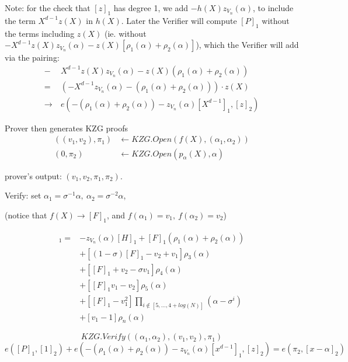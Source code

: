 \documentclass{article}
\theoremstyle{definition}
\begin{document}
\begin{footnotesize}
	Note: for the check that $[z]_1$ has degree 1, we add $-h(X) z_{V_n}(\alpha)$, to include the term $X^{d-1} z(X)$ in $h(X)$. Later the Verifier will compute $[P]_1$ without the terms including $z(X)$ (ie. without $-X^{d-1} z(X)z_{V_n}(\alpha)-z(X)[\rho_1(\alpha)+\rho_2(\alpha)]$), which the Verifier will add via the pairing:
	\begin{align*}
		-&X^{d-1} z(X)z_{V_n}(\alpha)-z(X)(\rho_1(\alpha)+\rho_2(\alpha))\\
		=~ &(-X^{d-1} z_{V_n}(\alpha) - (\rho_1(\alpha)+\rho_2(\alpha))) \cdot z(X)\\
		\longrightarrow~ &e(- (\rho_1(\alpha)+\rho_2(\alpha)) - z_{V_n}(\alpha) [X^{d-1}]_1, [z]_2)
	\end{align*}
\end{footnotesize}


Prover then generates KZG proofs
\begin{align*}
	((v_1, v_2), \pi_1) &\leftarrow KZG.Open(f(X), (\alpha_1, \alpha_2))\\
	(0, \pi_2) &\leftarrow KZG.Open(p_{\alpha}(X), \alpha)
\end{align*}

prover's output: $(v_1, v_2, \pi_1, \pi_2)$.

Verify:
set $\alpha_1=\sigma^{-1}\alpha, ~\alpha_2=\sigma^{-2}\alpha$,

\begin{footnotesize}(notice that $f(X)\rightarrow [F]_1$, and $f(\alpha_1)=v_1,~f(\alpha_2)=v_2$)\end{footnotesize}

\begin{align*}
	[P]_1 = &-z_{V_n}(\alpha)[H]_1 + [F]_1 (\rho_1(\alpha) + \rho_2(\alpha))\\
		&+ [(1-\sigma) [F]_1 - v_2 + v_1] \rho_3(\alpha)\\
		&+ [[F]_1 + v_2 - \sigma v_1] \rho_4(\alpha)\\
		&+ [[F]_1 v_1 - v_2] \rho_5(\alpha)\\
		&+ [[F]_1 - v_1^2] \prod_{i \notin [5, \ldots, 4+log(N)]} (\alpha - \sigma^i)\\
		&+ [v_1-1] \rho_n(\alpha)
\end{align*}

$$KZG.Verify((\alpha_1, \alpha_2), (v_1, v_2), \pi_1)$$
$$e([P]_1, [1]_2) + e(-(\rho_1(\alpha) + \rho_2(\alpha)) - z_{V_n}(\alpha) [x^{d-1}]_1, [z]_2) = e(\pi_2, [x-\alpha]_2)$$
\end{document}
